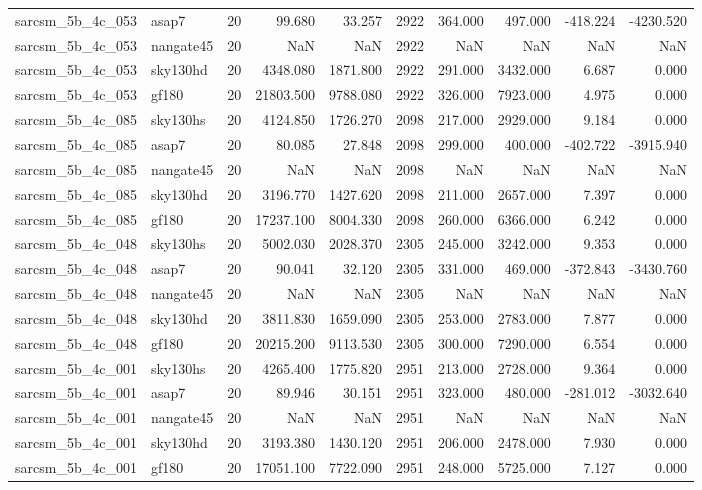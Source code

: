 \begin{tabular}{llrrrrrrrr}
sarcsm\_5b\_4c\_053 & asap7 & 20 & 99.680 & 33.257 & 2922 & 364.000 & 497.000 & -418.224 & -4230.520 \\
sarcsm\_5b\_4c\_053 & nangate45 & 20 & NaN & NaN & 2922 & NaN & NaN & NaN & NaN \\
sarcsm\_5b\_4c\_053 & sky130hd & 20 & 4348.080 & 1871.800 & 2922 & 291.000 & 3432.000 & 6.687 & 0.000 \\
sarcsm\_5b\_4c\_053 & gf180 & 20 & 21803.500 & 9788.080 & 2922 & 326.000 & 7923.000 & 4.975 & 0.000 \\
sarcsm\_5b\_4c\_085 & sky130hs & 20 & 4124.850 & 1726.270 & 2098 & 217.000 & 2929.000 & 9.184 & 0.000 \\
sarcsm\_5b\_4c\_085 & asap7 & 20 & 80.085 & 27.848 & 2098 & 299.000 & 400.000 & -402.722 & -3915.940 \\
sarcsm\_5b\_4c\_085 & nangate45 & 20 & NaN & NaN & 2098 & NaN & NaN & NaN & NaN \\
sarcsm\_5b\_4c\_085 & sky130hd & 20 & 3196.770 & 1427.620 & 2098 & 211.000 & 2657.000 & 7.397 & 0.000 \\
sarcsm\_5b\_4c\_085 & gf180 & 20 & 17237.100 & 8004.330 & 2098 & 260.000 & 6366.000 & 6.242 & 0.000 \\
sarcsm\_5b\_4c\_048 & sky130hs & 20 & 5002.030 & 2028.370 & 2305 & 245.000 & 3242.000 & 9.353 & 0.000 \\
sarcsm\_5b\_4c\_048 & asap7 & 20 & 90.041 & 32.120 & 2305 & 331.000 & 469.000 & -372.843 & -3430.760 \\
sarcsm\_5b\_4c\_048 & nangate45 & 20 & NaN & NaN & 2305 & NaN & NaN & NaN & NaN \\
sarcsm\_5b\_4c\_048 & sky130hd & 20 & 3811.830 & 1659.090 & 2305 & 253.000 & 2783.000 & 7.877 & 0.000 \\
sarcsm\_5b\_4c\_048 & gf180 & 20 & 20215.200 & 9113.530 & 2305 & 300.000 & 7290.000 & 6.554 & 0.000 \\
sarcsm\_5b\_4c\_001 & sky130hs & 20 & 4265.400 & 1775.820 & 2951 & 213.000 & 2728.000 & 9.364 & 0.000 \\
sarcsm\_5b\_4c\_001 & asap7 & 20 & 89.946 & 30.151 & 2951 & 323.000 & 480.000 & -281.012 & -3032.640 \\
sarcsm\_5b\_4c\_001 & nangate45 & 20 & NaN & NaN & 2951 & NaN & NaN & NaN & NaN \\
sarcsm\_5b\_4c\_001 & sky130hd & 20 & 3193.380 & 1430.120 & 2951 & 206.000 & 2478.000 & 7.930 & 0.000 \\
sarcsm\_5b\_4c\_001 & gf180 & 20 & 17051.100 & 7722.090 & 2951 & 248.000 & 5725.000 & 7.127 & 0.000 \\

\end{tabular}

